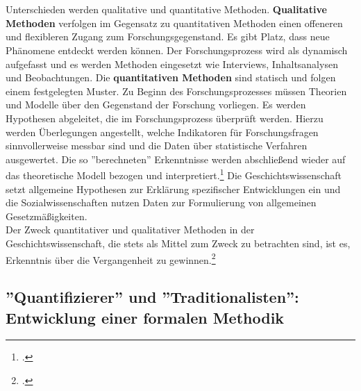 \documentclass[12pt,a4paper]{article}
\begin{document}
\\
\\
Unterschieden werden qualitative und quantitative Methoden. \textbf{Qualitative Methoden} verfolgen im Gegensatz zu quantitativen Methoden einen offeneren und flexibleren Zugang zum Forschungsgegenstand. Es gibt Platz, dass neue Phänomene entdeckt werden können. Der Forschungsprozess wird als dynamisch aufgefasst und es werden Methoden eingesetzt wie Interviews, Inhaltsanalysen und Beobachtungen. Die \textbf{quantitativen Methoden} sind statisch und folgen einem festgelegten Muster. Zu Beginn des Forschungsprozesses müssen Theorien und Modelle über den Gegenstand der Forschung vorliegen. Es werden Hypothesen abgeleitet, die im Forschungsprozess überprüft werden. Hierzu werden Überlegungen angestellt, welche Indikatoren für Forschungsfragen sinnvollerweise messbar sind und die Daten über statistische Verfahren ausgewertet. Die so ''berechneten'' Erkenntnisse werden abschließend wieder auf das theoretische Modell bezogen und interpretiert.\footcite[][S.309–329]{wolf1995qualitative} Die Geschichtswissenschaft setzt allgemeine Hypothesen zur Erklärung spezifischer Entwicklungen ein und die Sozialwissenschaften nutzen Daten zur Formulierung von allgemeinen Gesetzmäßigkeiten.
\\
Der Zweck quantitativer und qualitativer Methoden in der Geschichtswissenschaft, die stets als Mittel zum Zweck zu betrachten sind, ist es, Erkenntnis über die Vergangenheit zu gewinnen.\footcite[][S.203-206]{jarausch1985quantitative}

\newpage
\subsection{''Quantifizierer'' und ''Traditionalisten'': Entwicklung einer formalen Methodik }
\end{document}
